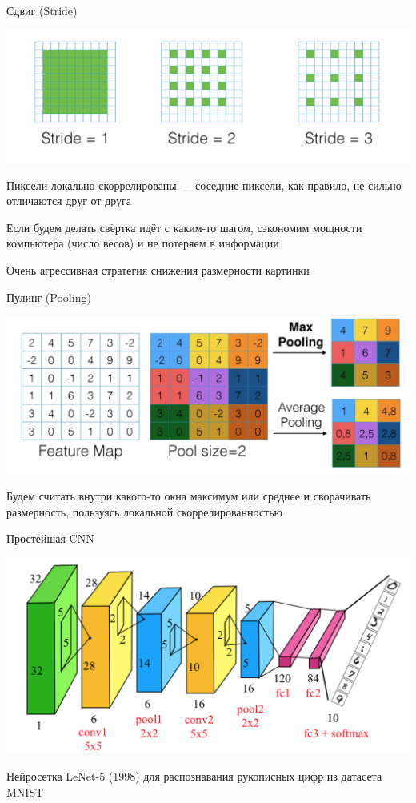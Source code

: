 \documentclass[notes,12pt, aspectratio=169]{beamer}
\newenvironment{wideitemize}{\itemize\addtolength{\itemsep}{10pt}}{\enditemize}
\begin{document}
\begin{frame}{Сдвиг (Stride)}
\begin{center}
	\includegraphics[width=.7\linewidth]{stride.png}
\end{center}
\begin{wideitemize}
	\item Пиксели локально скоррелированы — соседние пиксели, как правило, не сильно отличаются друг от друга	
	\item  Если будем делать свёртка идёт с каким-то шагом, сэкономим мощности компьютера (число весов) и не потеряем в информации
	\item  Очень агрессивная стратегия снижения размерности картинки 
\end{wideitemize}
\end{frame}


\begin{frame}{Пулинг (Pooling)}
\begin{center}
	\includegraphics[width=.7\linewidth]{pooling.png}
\end{center}
\begin{wideitemize}
	\item  Будем считать внутри какого-то окна максимум или среднее и сворачивать размерность, пользуясь локальной скоррелированностью 
\end{wideitemize}
\end{frame}


\begin{frame}{Простейшая CNN}
\begin{center}
	\includegraphics[width=.7\linewidth]{lenet.png}
\end{center}
\begin{wideitemize}
	\item  Нейросетка LeNet-5  (1998) для распознавания рукописных цифр из датасета MNIST
\end{wideitemize}
\end{frame}
\end{document}
